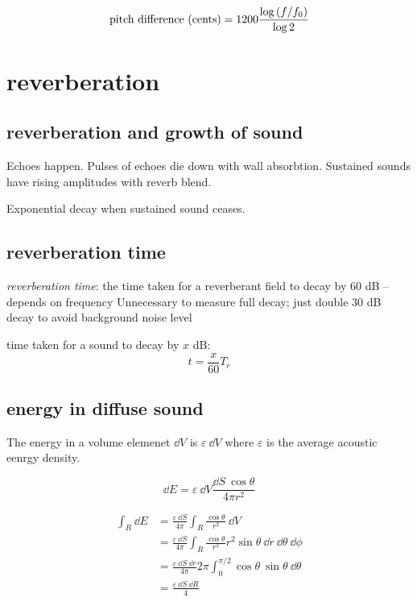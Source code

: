 \documentclass[10pt, a4paper, twocolumn]{article}
\newcommand{\deff}[1]{\par \noindent \textit{#1}: }
\begin{document}
\[\text{pitch difference (cents)}
= 1200\frac{\log\qty(f/f_0)}{\log 2}\]

\section{reverberation}
\subsection{reverberation and growth of sound}

Echoes happen. Pulses of echoes die down with wall absorbtion. Sustained sounds have rising amplitudes with reverb blend.

Exponential decay when sustained sound ceases.

\subsection{reverberation time}

\deff{reverberation time} the time taken for a reverberant field to decay by 60 dB -- depends on frequency
Unnecessary to measure full decay; just double 30 dB decay to avoid background noise level

time taken for a sound to decay by $x$ dB:
\[t = \frac{x}{60}T_r\]

\subsection{energy in diffuse sound}

The energy in a volume elemenet $\dd V$ is $\varepsilon\ \dd V$ where $\varepsilon$ is the average acoustic eenrgy density.

\[\dd E = \varepsilon\ \dd V \frac{\dd S\ \cos\theta}
{4\pi r^2}\]

\begin{equation*}
\begin{aligned}
\int _R\dd E &= \frac{\varepsilon\ \dd S}{4\pi}
\int _R \frac{\cos\theta}{r^2}\ \dd V
\\&= \frac{\varepsilon\ \dd S}{4\pi}
\int _R \frac{\cos\theta}{r^2}
r^2\sin\theta\ \dd r\ \dd \theta \ \dd \phi
\\&= \frac{\varepsilon\ \dd S\ \dd r}{4\pi}2\pi
\int _0^{\pi/2}\cos \theta \ \sin\theta\ \dd \theta
\\&= \frac{\varepsilon\ \dd S\ \dd R}{4}
\end{aligned}
\end{equation*}
\end{document}
